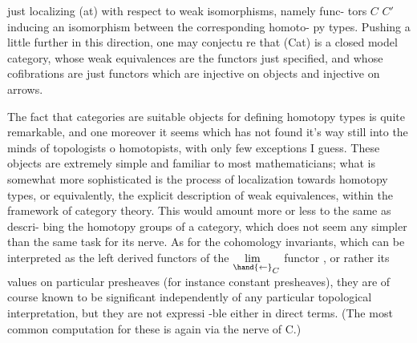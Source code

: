
just localizing (at) with respect to weak isomorphisms, namely func-%
tors $C$ \hand{$\to$} $C'$ inducing an isomorphism between the corresponding homoto-%
py types. Pushing a little further in this direction, one may conjectu%
re that (Cat) is a closed model category, whose weak equivalences are
the functors just specified, and whose cofibrations are just functors
which are injective on objects and injective on arrows.

The fact that categories are suitable objects for defining  homotopy
types is quite remarkable, and one moreover it seems which has not found
it's way still into the minds of topologists o homotopists, with only
few exceptions I guess. These objects are extremely simple and familiar
to most mathematicians; what is somewhat more sophisticated is the
process of localization towards homotopy types, or equivalently, the
explicit description of weak equivalences, within the framework of
 category theory. This would amount more or less to the same as descri-%
bing the homotopy groups of a category, which does not seem any simpler
than the same task for its nerve. As for the cohomology invariants, which
can be interpreted as the left derived functors of the $\underset{\hand{\leftarrow}}{\lim}_{C}$ functor ,
or rather its values on particular presheaves (for instance constant
presheaves), they are of course known to be significant\hand{,} independently
of any particular topological interpretation, but they are not expressi%
-ble either in direct terms. (The most common computation for these is
again via the nerve of C.)

